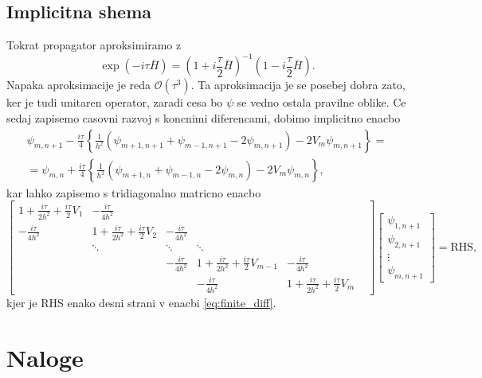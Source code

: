 \documentclass[11pt, a4paper]{article}
\begin{document}
    \subsection{Implicitna shema}
    Tokrat propagator aproksimiramo z
    $$\exp(-i\tau \bar{H}) = \left( 1 + i \frac{\tau}{2} \bar{H} \right)^{-1} \left( 1 - i\frac{\tau}{2} \bar{H} \right).$$
    Napaka aproksimacije je reda $\mathcal{O}(\tau^3)$. Ta aproksimacija je se posebej dobra zato, ker je tudi unitaren operator,
    zaradi cesa bo $\psi$ se vedno ostala pravilne oblike. Ce sedaj zapisemo casovni razvoj s koncnimi diferencami,
    dobimo implicitno enacbo
    \begin{multline*}
        \psi_{m,n+1} - \frac{i\tau}{4} \left\{ \frac{1}{h^2} (\psi_{m+1,n+1} + \psi_{m-1,n+1} - 2 \psi_{m,n+1}) - 2V_m \psi_{m,n+1} \right\} = \\
        = \psi_{m,n} + \frac{i\tau}{4} \left\{ \frac{1}{h^2} (\psi_{m+1,n} + \psi_{m-1,n} - 2 \psi_{m,n}) - 2 V_m \psi_{m,n} \right\},
    \end{multline*}
    kar lahko zapisemo s tridiagonalno matricno enacbo
    \begin{equation}
        \begin{bmatrix}
            1 + \frac{i\tau}{2h^2} + \frac{i\tau}{2}V_1 & - \frac{i\tau}{4h^2} & & &\\
            - \frac{i\tau}{4h^2} & 1 + \frac{i\tau}{2h^2} + \frac{i\tau}{2}V_2 & - \frac{i\tau}{4h^2} & &\\
            & \ddots & \ddots & \ddots & &\\
            & & - \frac{i\tau}{4h^2} & 1 + \frac{i\tau}{2h^2} + \frac{i\tau}{2}V_{m-1} &- \frac{i\tau}{4h^2}\\
            & & &  - \frac{i\tau}{4h^2} & 1 + \frac{i\tau}{2h^2} + \frac{i\tau}{2}V_m
        \end{bmatrix} \begin{bmatrix}
            \psi_{1,n+1} \\ \psi_{2,n+1} \\ \vdots \\ \psi_{m,n+1}
        \end{bmatrix} = \text{RHS},
    \end{equation}
    kjer je RHS enako desni strani v enacbi \ref{eq:finite_diff}.


    \section{Naloge}
\end{document}

